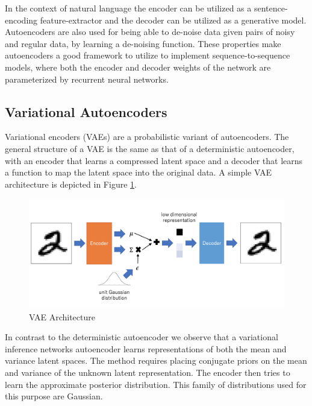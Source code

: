 In the context of natural language the encoder can be utilized as a sentence-encoding feature-extractor and the decoder can be utilized as a generative model. Autoencoders are also used for being able to de-noise data given pairs of noisy and regular data, by learning a de-noising function. These properties make autoencoders a good framework to utilize to implement sequence-to-sequence models, where both the encoder and decoder weights of the network are parameterized by recurrent neural networks.

\subsection{Variational Autoencoders}

Variational encoders (VAEs) \citep{kingma2013auto} are a probabilistic variant of autoencoders. The general structure of a VAE is the same as that of a deterministic autoencoder, with an encoder that learns a compressed latent space and a decoder that learns a function to map the latent space into the original data. A simple VAE architecture is depicted in Figure \ref{fig:vae-structure}.

\begin{figure}[ht]
	\centering
	\includegraphics[width=\textwidth]{images/vae-structure}
	\caption{\label{fig:vae-structure} VAE Architecture}
\end{figure}

In contrast to the deterministic autoencoder we observe that a variational inference networks autoencoder learns representations of both the mean and variance latent spaces. The method requires placing conjugate priors on the mean and variance of the unknown latent representation. The encoder then tries to learn the approximate posterior distribution. This family of distributions used for this purpose are Gaussian.


